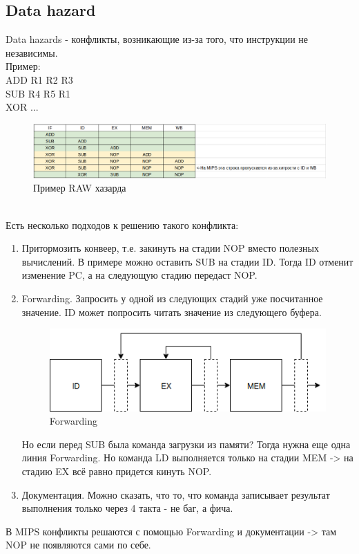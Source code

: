 \documentclass[12pt, a4paper]{article}
\begin{document}
\subsection{Data hazard}
Data hazards - конфликты, возникающие из-за того, что инструкции не независимы.\\
Пример:\\
ADD R1 R2 R3\\
SUB R4 R5 R1\\
XOR ...
\begin{figure}[h]
    \centering
    \includegraphics[width = 0.8\linewidth]{./images/RAW.png}
    \caption{Пример RAW хазарда}
    \label{fig:RAW}
\end{figure}\\
Есть несколько подходов к решению такого конфликта:
\begin{enumerate}
    \item Притормозить конвеер, т.е. закинуть на стадии NOP вместо полезных вычислений. В примере можно оставить SUB на стадии ID. Тогда ID отменит изменение PC, а на следующую стадию передаст NOP.
    \item Forwarding. Запросить у одной из следующих стадий уже посчитанное значение. ID может попросить читать значение из следующего буфера.
    \begin{figure}
        \centering
        \includegraphics[width=0.8\linewidth]{images/Forwarding.png}
        \caption{Forwarding}
        \label{fig:my_label}
    \end{figure}
    Но если перед SUB была команда загрузки из памяти? Тогда нужна еще одна линия Forwarding. Но команда LD выполняется только на стадии MEM -> на стадию EX всё равно придется кинуть NOP.
    \item Документация. Можно сказать, что то, что команда записывает результат выполнения только через 4 такта - не баг, а фича.
\end{enumerate}
В MIPS конфликты решаются с помощью Forwarding и документации -> там NOP не появляются сами по себе.
\end{document}
